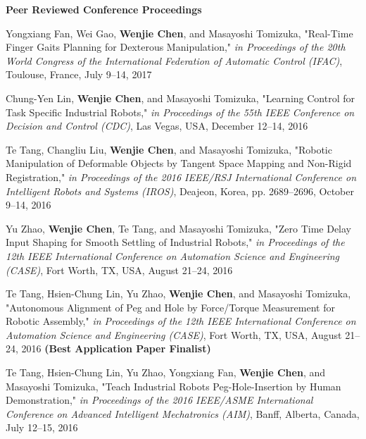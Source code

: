 \documentclass[UTF8,fontset=none]{res}
\begin{document}
\begin{resume}
    \textbf{Peer Reviewed Conference Proceedings} %
    \begin{etaremune}[start=26]
    \item Yongxiang Fan, Wei Gao, \textbf{Wenjie Chen}, and Masayoshi Tomizuka, "Real-Time Finger Gaits Planning for Dexterous Manipulation," \emph{in Proceedings of the 20th World Congress of the International Federation of Automatic Control (IFAC)}, Toulouse, France, July 9--14, 2017
    \item Chung-Yen Lin, \textbf{Wenjie Chen}, and Masayoshi Tomizuka, "Learning Control for Task Specific Industrial Robots," \emph{in Proceedings of the 55th IEEE Conference on Decision and Control (CDC)}, Las Vegas, USA, December 12--14, 2016
	\item Te Tang, Changliu Liu, \textbf{Wenjie Chen}, and Masayoshi Tomizuka, "Robotic Manipulation of Deformable Objects by Tangent Space Mapping and Non-Rigid Registration," \emph{in Proceedings of the 2016 IEEE/RSJ International Conference on Intelligent Robots and Systems (IROS)}, Deajeon, Korea, pp. 2689--2696, October 9--14, 2016
	\item Yu Zhao, \textbf{Wenjie Chen}, Te Tang, and Masayoshi Tomizuka, "Zero Time Delay Input Shaping for Smooth Settling of Industrial Robots," \emph{in Proceedings of the 12th IEEE International Conference on Automation Science and Engineering (CASE)}, Fort Worth, TX, USA, August 21--24, 2016
	\item Te Tang, Hsien-Chung Lin, Yu Zhao, \textbf{Wenjie Chen}, and Masayoshi Tomizuka, "Autonomous Alignment of Peg and Hole by Force/Torque Measurement for Robotic Assembly," \emph{in Proceedings of the 12th IEEE International Conference on Automation Science and Engineering (CASE)}, Fort Worth, TX, USA, August 21--24, 2016 \textbf{(Best Application Paper Finalist)}
	\item Te Tang, Hsien-Chung Lin, Yu Zhao, Yongxiang Fan, \textbf{Wenjie Chen}, and Masayoshi Tomizuka, "Teach Industrial Robots Peg-Hole-Insertion by Human Demonstration," \emph{in Proceedings of the 2016 IEEE/ASME International Conference on Advanced Intelligent Mechatronics (AIM)}, Banff, Alberta, Canada, July 12--15, 2016

\end{etaremune}
\end{resume}
\end{document}
